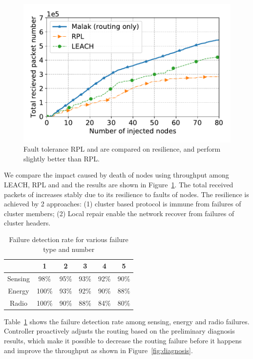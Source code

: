 \begin{figure}[htbp]
	\centering
	\includegraphics[width=.95\columnwidth]{Figure/fault_tolerance}
	\vspace{-0.1in}
	\caption{Fault tolerance
		\textnormal{
			RPL and {\sdn} are compared on resilience, and {\sdn} perform
			slightly better than RPL.
		}}
	\label{fig:fault_tolerance}
\end{figure}

We compare the impact caused by death of nodes using throughput among LEACH, RPL
and {\sdn} and the results are shown in Figure~\ref{fig:fault_tolerance}. The
total received packets of {\sdn} increases stably due to its resilience to faults
of nodes. The resilience is achieved by 2 approaches: (1) cluster based protocol
is immune from failures of cluster members; (2) Local repair enable the network
recover from failures of cluster headers.

\begin{table}[htbp]
	\centering
	\caption{Failure detection rate for various failure type and number}
	\label{tab:diagnosis}
	\begin{tabular}{|c||c|c|c|c|c|}
		\hline
		\diagbox{Type}{Failures} & 1 & 2 & 3 & 4 & 5\\
		\hline
		\hline
		Sensing & 98\% & 95\% & 93\% & 92\% & 90\%\\
		\hline
		Energy & 100\% & 93\% & 92\% & 90\% & 88\%\\
		\hline
		Radio & 100\% & 90\% & 88\% & 84\% & 80\%\\
		\hline
	\end{tabular}
\end{table}

Table~\ref{tab:diagnosis} shows the failure detection rate among sensing, energy
and radio failures. Controller proactively adjusts the routing based on the
preliminary diagnosis results, which make it possible to decrease the routing
failure before it happens and improve the throughput as shown in
Figure~\ref{fig:diagnosis}.

